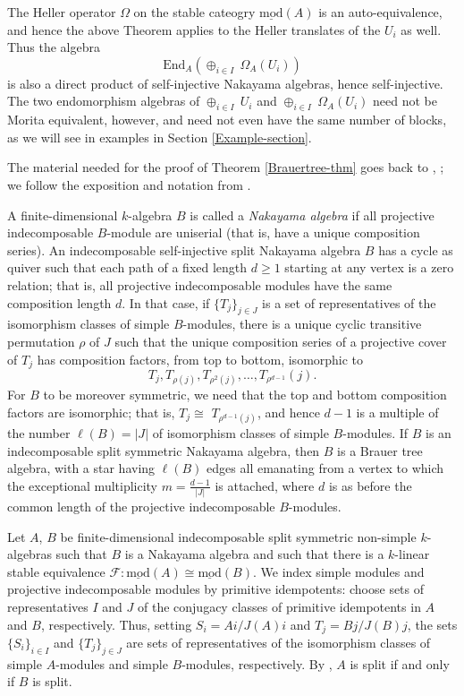\documentclass{amsart}
\theoremstyle{plain}\newtheorem{Theorem}{Theorem}[section]
\theoremstyle{plain}\newtheorem{Conjecture}[Theorem]{Conjecture}
\theoremstyle{plain}\newtheorem{Corollary}[Theorem]{Corollary}
\theoremstyle{plain}\newtheorem{Lemma}[Theorem]{Lemma}
\theoremstyle{plain}\newtheorem{Proposition}[Theorem]{Proposition}
\theoremstyle{definition}\newtheorem{Definition}[Theorem]{Definition}
\theoremstyle{definition}\newtheorem{Example}[Theorem]{Example}
\theoremstyle{definition}\newtheorem{Examples}[Theorem]{Examples}
\theoremstyle{definition}\newtheorem{Exercise}[Theorem]{Exercise}
\theoremstyle{definition}\newtheorem{Notation}[Theorem]{Notation}
\theoremstyle{definition}\newtheorem{Remark}[Theorem]{Remark}
\theoremstyle{definition}\newtheorem{Remarks}[Theorem]{Remarks}
\theoremstyle{plain}\newtheorem{Statement}[Theorem]{}
\def\CF{{\mathcal{F}}}  \def\OS{{\mathcal{O}S}}
\def\End{\mathrm{End}}
\def\modbar{\underline{\mathrm{mod}}}
\begin{document}
The Heller operator $\Omega$ on the stable cateogry $\modbar(A)$
is an auto-equivalence, and hence the above Theorem applies to the Heller 
translates of the $U_i$ as well.  Thus the algebra
$$\End_A(\oplus_{i\in I}\ \Omega_A(U_i))$$ 
is also a direct product of
self-injective Nakayama algebras, hence self-injective. The two endomorphism
algebras of $\oplus_{i\in I} \ U_i$ and $\oplus_{i\in I}\ \Omega_A(U_i)$
need not be Morita equivalent, however, and need not even have the same
number of blocks, as we will see in examples in Section \ref{Example-section}.


\medskip
The  material needed for the proof of Theorem
\ref{Brauertree-thm} goes back to \cite{GaRie}, \cite{Greenwalk}; we follow
the exposition and notation from \cite[Sections 11.6, 11.7]{LiBookII}.


\medskip
A finite-dimensional $k$-algebra $B$ is called a {\em Nakayama algebra} if all
projective indecomposable $B$-module are uniserial (that is, have a unique
composition series).  An indecomposable self-injective split 
Nakayama algebra $B$ has a cycle as quiver such that each path of a fixed length 
$d\geq 1$ starting at any vertex is a zero relation; that is, 
all projective indecomposable modules have the same composition length $d$.
In that case, if $\{T_j\}_{j\in J}$ is a set of representatives of the isomorphism classes of
simple $B$-modules, there is a unique cyclic transitive permutation $\rho$ of $J$
such that the unique composition series of a projective cover of $T_j$ has 
composition factors, from top to bottom, isomorphic to 
$$T_j, T_{\rho(j)}, T_{\rho^2(j)},\dots, T_{\rho^{d-1}}(j).$$
For $B$ to be moreover symmetric, we need that the top and bottom composition 
factors are isomorphic; that is, $T_j\cong$ $T_{\rho^{d-1}(j)}$,
and hence $d-1$ is  a multiple of the number $\ell(B)=|J|$ of isomorphism classes
of simple $B$-modules. If $B$ is an indecomposable split symmetric Nakayama
algebra, then $B$ is a Brauer tree algebra, with a star having $\ell(B)$ edges all 
emanating from a vertex to which the exceptional multiplicity $m=\frac{d-1}{|J|}$ 
is attached, where $d$ is as before  the common length of the projective indecomposable
$B$-modules. 

\medskip
Let $A$, $B$ be finite-dimensional indecomposable split symmetric non-simple 
$k$-algebras  such that $B$ is a Nakayama algebra and such that there is a 
$k$-linear stable equivalence $\CF : \modbar(A)\cong\modbar(B)$.
We index simple modules and projective indecomposable modules by  primitive 
idempotents: choose sets of representatives $I$ and $J$ of the conjugacy classes of 
primitive idempotents in $A$ and $B$, respectively. 
Thus, setting $S_i=Ai/J(A)i$ and $T_j=Bj/J(B)j$, the sets $\{S_i\}_{i\in I}$ and
$\{T_j\}_{j\in J}$ are sets of representatives of the isomorphism classes of
simple $A$-modules and simple $B$-modules, respectively. By 
\cite[Proposition 11.6.2]{LiBookII}, $A$ is split if and only if $B$ is split.
\end{document}
